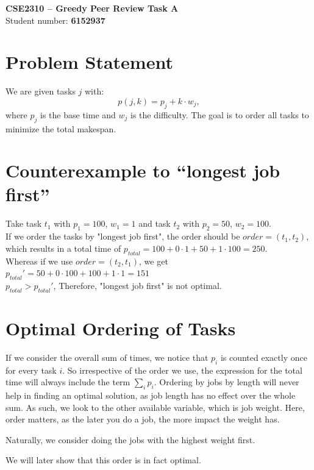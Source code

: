 \documentclass[a4paper,11pt]{article}
\begin{document}
\begin{center}
    {\Large \textbf{CSE2310 – Greedy Peer Review Task A}}\\[4pt]
    Student number: \textbf{6152937}
\end{center}

\vspace{1em}

\section*{Problem Statement}
We are given tasks $j$ with:
\[
p(j,k) = p_j + k \cdot w_j,
\]
where $p_j$ is the base time and $w_j$ is the difficulty. The goal is to order all tasks to minimize the total makespan.

\section{Counterexample to “longest job first”}
Take task $t_1$ with $p_1 = 100$, $w_1 = 1$ and task $t_2$ with $p_2 = 50$, $w_2 = 100$. \\
If we order the tasks by "longest job first", the order should be $order = (t_1, t_2)$, which results in a total time of $p_{total} = 100 + 0 \cdot 1  + 50 + 1 \cdot 100 = 250$.\\
Whereas if we use $order = (t_2, t_1)$, we get $p_{total}' = 50 + 0 \cdot 100 + 100 + 1 \cdot 1 = 151$\\

$p_{total} > p_{total}'$, Therefore, "longest job first" is not optimal.

\section{Optimal Ordering of Tasks}
If we consider the overall sum of times, we notice that $p_i$ is counted exactly once for every task $i$. So irrespective of the order we use, the expression for the total time will always include the term $\sum_{i} p_i$. Ordering by jobs by length will never help in finding an optimal solution, as job length has no effect over the whole sum. As such, we look to the other available variable, which is job weight. Here, order matters, as the later you do a job, the more impact the weight has.

Naturally, we consider doing the jobs with the highest weight first.

We will later show that this order is in fact optimal.
\end{document}
